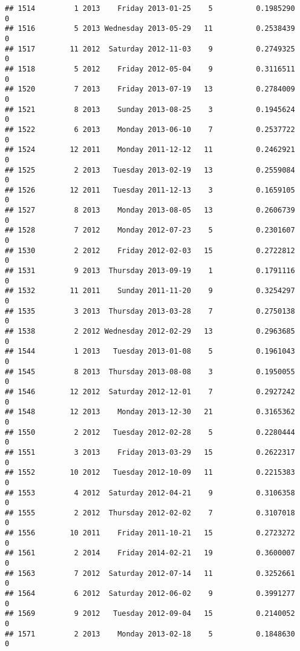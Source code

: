 \documentclass[
]{article}
\begin{document}
\begin{verbatim}
## 1514         1 2013    Friday 2013-01-25    5          0.1985290             0
## 1516         5 2013 Wednesday 2013-05-29   11          0.2538439             0
## 1517        11 2012  Saturday 2012-11-03    9          0.2749325             0
## 1518         5 2012    Friday 2012-05-04    9          0.3116511             0
## 1520         7 2013    Friday 2013-07-19   13          0.2784009             0
## 1521         8 2013    Sunday 2013-08-25    3          0.1945624             0
## 1522         6 2013    Monday 2013-06-10    7          0.2537722             0
## 1524        12 2011    Monday 2011-12-12   11          0.2462921             0
## 1525         2 2013   Tuesday 2013-02-19   13          0.2559084             0
## 1526        12 2011   Tuesday 2011-12-13    3          0.1659105             0
## 1527         8 2013    Monday 2013-08-05   13          0.2606739             0
## 1528         7 2012    Monday 2012-07-23    5          0.2301607             0
## 1530         2 2012    Friday 2012-02-03   15          0.2722812             0
## 1531         9 2013  Thursday 2013-09-19    1          0.1791116             0
## 1532        11 2011    Sunday 2011-11-20    9          0.3254297             0
## 1535         3 2013  Thursday 2013-03-28    7          0.2750138             0
## 1538         2 2012 Wednesday 2012-02-29   13          0.2963685             0
## 1544         1 2013   Tuesday 2013-01-08    5          0.1961043             0
## 1545         8 2013  Thursday 2013-08-08    3          0.1950055             0
## 1546        12 2012  Saturday 2012-12-01    7          0.2927242             0
## 1548        12 2013    Monday 2013-12-30   21          0.3165362             0
## 1550         2 2012   Tuesday 2012-02-28    5          0.2280444             0
## 1551         3 2013    Friday 2013-03-29   15          0.2622317             0
## 1552        10 2012   Tuesday 2012-10-09   11          0.2215383             0
## 1553         4 2012  Saturday 2012-04-21    9          0.3106358             0
## 1555         2 2012  Thursday 2012-02-02    7          0.3107018             0
## 1556        10 2011    Friday 2011-10-21   15          0.2723272             0
## 1561         2 2014    Friday 2014-02-21   19          0.3600007             0
## 1563         7 2012  Saturday 2012-07-14   11          0.3252661             0
## 1564         6 2012  Saturday 2012-06-02    9          0.3991277             0
## 1569         9 2012   Tuesday 2012-09-04   15          0.2140052             0
## 1571         2 2013    Monday 2013-02-18    5          0.1848630             0

\end{verbatim}
\end{document}
